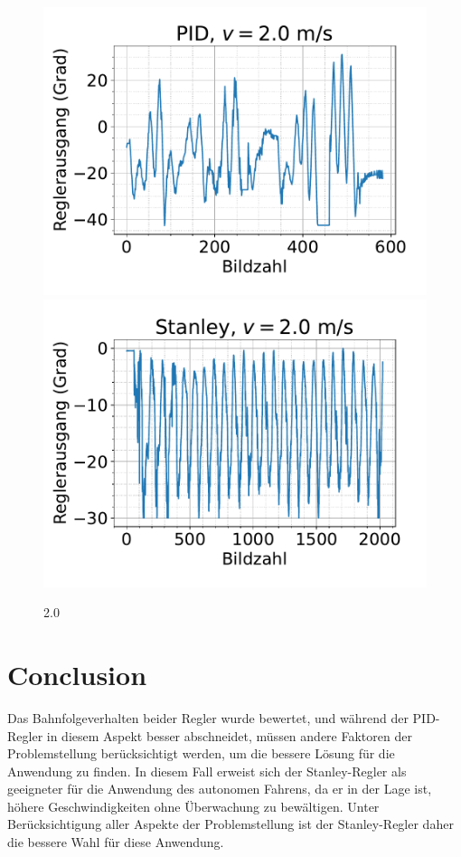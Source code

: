 \documentclass[arbeit=studie,oneside,BCOR=12mm]{ArbeitRST}
\begin{document}
\begin{figure}[h]
    \centering
    \includegraphics[scale=0.47]{pid2.0}
    \includegraphics[scale=0.47]{Stan2.0}
    \caption{2.0}
    \label{reg:2.0}
\end{figure}




\chapter{Conclusion}

Das Bahnfolgeverhalten beider Regler wurde bewertet, und während der PID-Regler
in diesem Aspekt besser abschneidet, müssen andere Faktoren der Problemstellung
berücksichtigt werden, um die bessere Lösung für die Anwendung zu finden. In
diesem Fall erweist sich der Stanley-Regler als geeigneter für die Anwendung
des autonomen Fahrens, da er in der Lage ist, höhere Geschwindigkeiten ohne
Überwachung zu bewältigen. Unter Berücksichtigung aller Aspekte der
Problemstellung ist der Stanley-Regler daher die bessere Wahl für diese
Anwendung.
\end{document}
